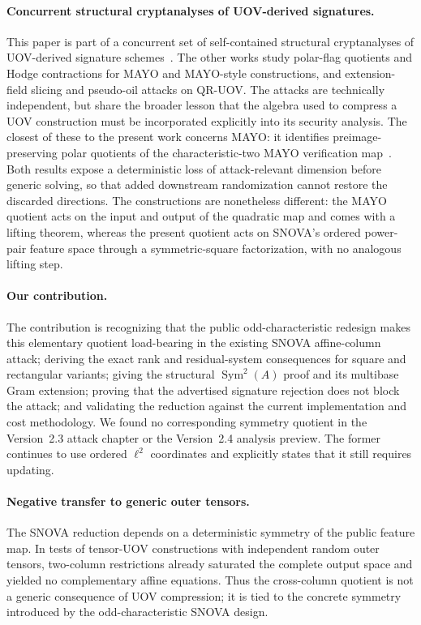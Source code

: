 \documentclass[11pt]{article}
\newcommand{\Sym}{\operatorname{Sym}}
\newcommand{\SNOVA}{\textsf{SNOVA}}
\newcommand{\QRUOV}{\textsf{QR-UOV}}
\newcommand{\MAYO}{\textsf{MAYO}}
\begin{document}
\paragraph{Concurrent structural cryptanalyses of UOV-derived signatures.}
This paper is part of a concurrent set of self-contained structural
cryptanalyses of UOV-derived signature schemes~\cite{PolarHodgeMAYO,FasterQRUOV}.
The other works study polar-flag quotients and Hodge contractions for \MAYO{}
and \MAYO{}-style constructions, and extension-field slicing and pseudo-oil
attacks on \QRUOV{}.  The attacks are technically independent, but share the
broader lesson that the algebra used to compress a UOV construction must be
incorporated explicitly into its security analysis.  The closest of these to the
present work concerns \MAYO{}: it identifies preimage-preserving polar quotients
of the characteristic-two \MAYO{} verification map~\cite{PolarHodgeMAYO}.  Both
results expose a deterministic loss of attack-relevant dimension before generic
solving, so that added downstream randomization cannot restore the discarded
directions.  The constructions are nonetheless different: the \MAYO{} quotient
acts on the input and output of the quadratic map and comes with a lifting
theorem, whereas the present quotient acts on \SNOVA{}'s ordered power-pair
feature space through a symmetric-square factorization, with no analogous
lifting step.

\paragraph{Our contribution.}
The contribution is recognizing that the public odd-characteristic redesign makes this elementary quotient load-bearing in the existing \SNOVA{}
affine-column attack; deriving the exact rank and residual-system consequences
for square and rectangular variants; giving the structural
$\Sym^2(A)$ proof and its multibase Gram extension; proving that the advertised
signature rejection does not block the attack; and validating the reduction
against the current implementation and cost methodology.  We found no
corresponding symmetry quotient in the Version~2.3 attack chapter or the Version~2.4 analysis preview.  The former continues to use ordered $\ell^2$ coordinates and explicitly states that it still requires updating.

\paragraph{Negative transfer to generic outer tensors.}
The \SNOVA{} reduction depends on a deterministic symmetry of the public feature map.  In tests of tensor-UOV constructions with independent random outer tensors, two-column restrictions already saturated the complete output space and yielded no complementary affine equations.  Thus the cross-column quotient is not a generic consequence of UOV compression; it is tied to the concrete symmetry introduced by the odd-characteristic \SNOVA{} design.
\end{document}
